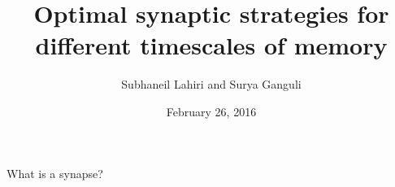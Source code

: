 \documentclass{beamer}%
\title[Timescales of memory]{Optimal synaptic strategies for different timescales of memory}
\author[Lahiri and Ganguli]{Subhaneil Lahiri and Surya Ganguli%
}
\institute[Stanford]{%
Stanford University, Applied Physics
}
\date{February 26, 2016}
\begin{document}

\begin{frame}
%
 \titlepage
%
\end{frame}

%
%
%
%
%

\begin{frame}{What is a synapse?}
%
 \begin{center}
 \parbox[c]{0.45\linewidth}{
  \begin{center}
  \end{center}
 }
 \parbox[c]{0.45\linewidth}{
  \begin{center}
  \end{center}
 }

 \parbox[c]{0.45\linewidth}{
  \begin{center}
  \end{center}
 }
 \parbox[c]{0.45\linewidth}{
 }
 \end{center}
%
\end{frame}

\end{document}
